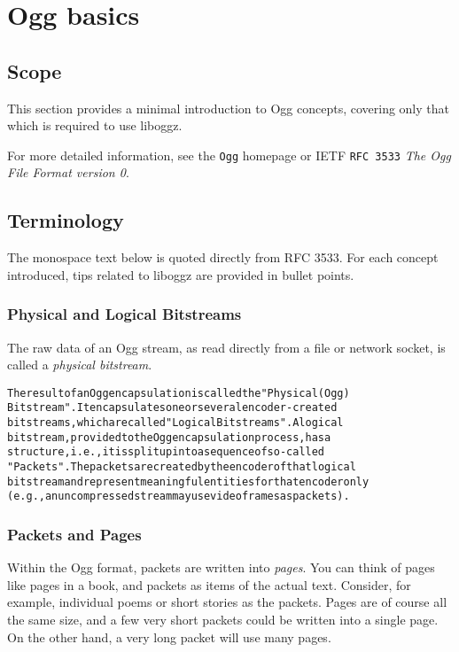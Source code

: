 \section{Ogg basics}
\label{group__basics}
\subsection{Scope}\label{Scope}
This section provides a minimal introduction to Ogg concepts, covering only that which is required to use liboggz.

For more detailed information, see the {\tt Ogg} homepage or IETF {\tt RFC 3533} {\em The Ogg File Format version 0\/}.\subsection{Terminology}\label{Terminology}
The monospace text below is quoted directly from RFC 3533. For each concept introduced, tips related to liboggz are provided in bullet points.\subsubsection{Physical and Logical Bitstreams}\label{bitstreams}
The raw data of an Ogg stream, as read directly from a file or network socket, is called a {\em physical bitstream\/}.

\small\begin{alltt}
   The result of an Ogg encapsulation is called the "Physical (Ogg)
   Bitstream".  It encapsulates one or several encoder-created
   bitstreams, which are called "Logical Bitstreams".  A logical
   bitstream, provided to the Ogg encapsulation process, has a
   structure, i.e., it is split up into a sequence of so-called
   "Packets".  The packets are created by the encoder of that logical
   bitstream and represent meaningful entities for that encoder only
   (e.g., an uncompressed stream may use video frames as packets).
\end{alltt}\normalsize 
\subsubsection{Packets and Pages}\label{pages}
Within the Ogg format, packets are written into {\em pages\/}. You can think of pages like pages in a book, and packets as items of the actual text. Consider, for example, individual poems or short stories as the packets. Pages are of course all the same size, and a few very short packets could be written into a single page. On the other hand, a very long packet will use many pages.


